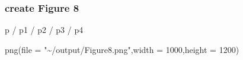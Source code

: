 \documentclass[
]{article}
\newenvironment{Shaded}{\begin{snugshade}}{\end{snugshade}}
\newcommand{\AttributeTok}[1]{\textcolor[rgb]{0.77,0.63,0.00}{#1}}
\newcommand{\DecValTok}[1]{\textcolor[rgb]{0.00,0.00,0.81}{#1}}
\newcommand{\FunctionTok}[1]{\textcolor[rgb]{0.00,0.00,0.00}{#1}}
\newcommand{\NormalTok}[1]{#1}
\newcommand{\SpecialCharTok}[1]{\textcolor[rgb]{0.00,0.00,0.00}{#1}}
\newcommand{\StringTok}[1]{\textcolor[rgb]{0.31,0.60,0.02}{#1}}
\begin{document}
\hypertarget{create-figure-8}{%
\subsubsection{create Figure 8}\label{create-figure-8}}

\begin{Shaded}
\begin{Highlighting}[]
\NormalTok{p }\SpecialCharTok{/}\NormalTok{ p1 }\SpecialCharTok{/}\NormalTok{ p2 }\SpecialCharTok{/}\NormalTok{ p3 }\SpecialCharTok{/}\NormalTok{ p4}

\FunctionTok{png}\NormalTok{(}\AttributeTok{file =} \StringTok{"\textasciitilde{}/output/Figure8.png"}\NormalTok{,}\AttributeTok{width =} \DecValTok{1000}\NormalTok{,}\AttributeTok{height =} \DecValTok{1200}\NormalTok{)}
\end{Highlighting}
\end{Shaded}
\end{document}
